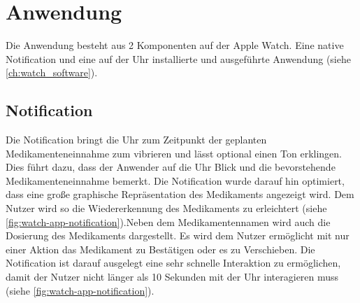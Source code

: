 \section{Anwendung}

Die Anwendung besteht aus 2 Komponenten auf der Apple Watch. Eine native Notification  und eine auf der Uhr installierte und ausgeführte Anwendung (siehe \ref{ch:watch_software}).

\subsection{Notification}
 Die Notification bringt die Uhr zum Zeitpunkt der geplanten Medikamenteneinnahme zum vibrieren und lässt optional einen Ton erklingen. Dies führt dazu, dass der Anwender auf die Uhr Blick und die bevorstehende Medikamenteneinnahme bemerkt. Die Notification wurde darauf hin optimiert, dass eine große graphische Repräsentation des Medikaments angezeigt wird. Dem Nutzer wird so die Wiedererkennung des Medikaments zu erleichtert (siehe \ref{fig:watch-app-notification}).Neben dem Medikamentennamen wird auch die Dosierung des Medikaments dargestellt. Es wird dem Nutzer ermöglicht mit nur einer Aktion das Medikament zu Bestätigen oder es zu Verschieben. Die Notification ist darauf ausgelegt eine sehr schnelle Interaktion zu ermöglichen, damit der Nutzer nicht länger als 10 Sekunden mit der Uhr interagieren muss (siehe \ref{fig:watch-app-notification}).
 
